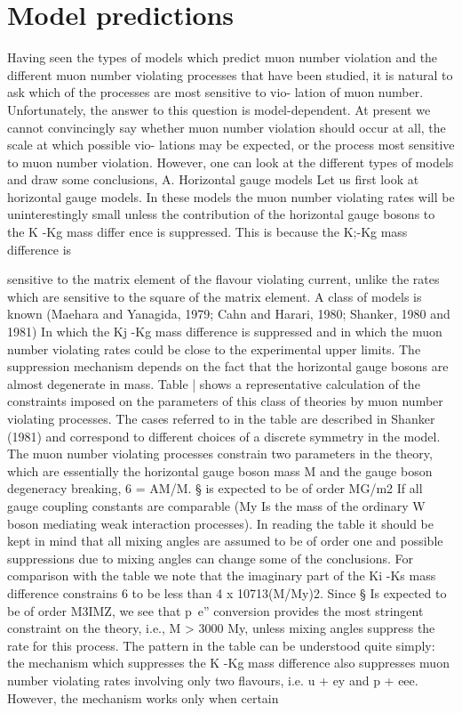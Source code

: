 \documentclass[twoside]{article}
\begin{document}
{{{{{{{{{{{{{{\section{\label{sec4}Model predictions}

Having seen the types of models which predict muon number violation
and the different muon number violating processes that have been studied,
it is natural to ask which of the processes are most sensitive to vio-
lation of muon number. Unfortunately, the answer to this question is
model-dependent. At present we cannot convincingly say whether muon
number violation should occur at all, the scale at which possible vio-
lations may be expected, or the process most sensitive to muon number
violation. However, one can look at the different types of models and
draw some conclusions,
A. Horizontal gauge models
Let us first look at horizontal gauge models. In these models the
muon number violating rates will be uninterestingly small unless the
contribution of the horizontal gauge bosons to the K -Kg mass differ
ence is suppressed. This is because the K;-Kg mass difference is

sensitive to the matrix element of the flavour violating current, unlike
the rates which are sensitive to the square of the matrix element. A
class of models is known (Maehara and Yanagida, 1979; Cahn and Harari,
1980; Shanker, 1980 and 1981) In which the Kj -Kg mass difference is
suppressed and in which the muon number violating rates could be close
to the experimental upper limits. The suppression mechanism depends on
the fact that the horizontal gauge bosons are almost degenerate in mass.
Table | shows a representative calculation of the constraints imposed
on the parameters of this class of theories by muon number violating
processes. The cases referred to in the table are described in Shanker
(1981) and correspond to different choices of a discrete symmetry in
the model. The muon number violating processes constrain two parameters
in the theory, which are essentially the horizontal gauge boson mass M
and the gauge boson degeneracy breaking, 6 = AM/M. § is expected to be
of order MG/m2 If all gauge coupling constants are comparable (My Is the
mass of the ordinary W boson mediating weak interaction processes). In
reading the table it should be kept in mind that all mixing angles are
assumed to be of order one and possible suppressions due to mixing
angles can change some of the conclusions. For comparison with the table
we note that the imaginary part of the Ki -Ks mass difference constrains
6 to be less than 4 x 10713(M/My)2. Since § Is expected to be of order
M3IMZ, we see that p~e” conversion provides the most stringent constraint
on the theory, i.e., M > 3000 My, unless mixing angles suppress the
rate for this process. The pattern in the table can be understood quite
simply: the mechanism which suppresses the K -Kg mass difference also
suppresses muon number violating rates involving only two flavours, i.e.
u + ey and p + eee. However, the mechanism works only when certain

}}}}}}}}}}}}}}
\end{document}
